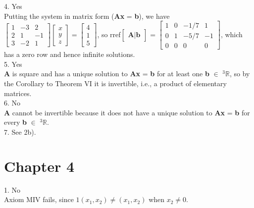 \documentclass{article}
\begin{document}
4. Yes\\
Putting the system in matrix form (\textbf{Ax} = \textbf{b}), we have\\
$\begin{bmatrix} 1 & -3 & 2\\2 & 1 & -1\\3&-2&1\end{bmatrix}\begin{bmatrix} x \\ y \\ z\end{bmatrix} = \begin{bmatrix} 4 \\ 1 \\ 5\end{bmatrix}$, so rref$\begin{bmatrix} \textbf{A} | \textbf{b}\end{bmatrix}$ = $\begin{bmatrix} 1 & 0 & -1/7 & 1\\0 & 1 & -5/7 & -1\\0&0&0&0\end{bmatrix}$, which has a zero row and hence infinite solutions. \\

5. Yes\\
\textbf{A} is square and has a unique solution to \textbf{Ax} = \textbf{b} for at least one \textbf{b} $\in$ $^3$$\mathbb{R}$, so by the Corollary to Theorem VI it is invertible, i.e., a product of elementary matrices.\\

      6. No\\
      \textbf{A} cannot be invertible because it does not have a unique solution to \textbf{Ax} = \textbf{b} for every \textbf{b} $\in$ $^3$$\mathbb{R}$.\\

    7. See 2b).

    \section*{Chapter 4}
    \setlength{\parindent}{0pt}
    1. No\\
    Axiom MIV fails, since $1(x_1, x_2) \neq (x_1, x_2)$ when $x_2 \neq 0$.
\end{document}
